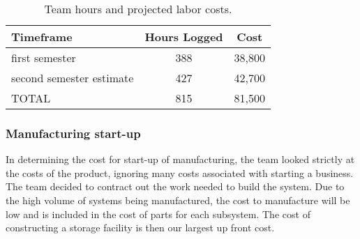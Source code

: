 \begin{table}[htdp]
\caption{Team hours and projected labor costs.}
\begin{center}
\begin{tabular}{|l|c|c|}\hline\rowcolor{lightgray}
Timeframe & Hours Logged & Cost \\\hline
first semester & 388 & 38,800\\\hline
second semester estimate & 427 & 42,700\\\hline
TOTAL & 815 & 81,500\\\hline
\end{tabular}
\end{center}
\label{tab:labour_costs}
\end{table}%


\subsubsection{Manufacturing start-up}
In determining the cost for start-up of manufacturing, the team looked strictly at the costs of the product, ignoring many costs associated with starting a business. The team decided to contract out the work needed to build the system. Due to the high volume of systems being manufactured, the cost to manufacture will be low and is included in the cost of parts for each subsystem. The cost of constructing a storage facility is then our largest up front cost. %



